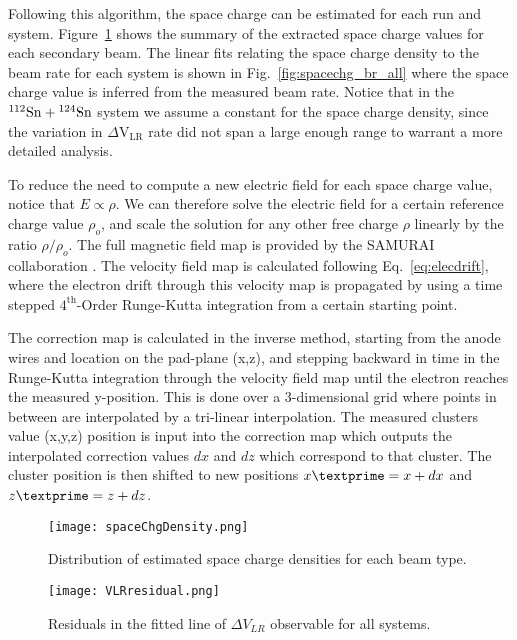 Following this algorithm, the space charge can be estimated for each run and system. Figure~\ref{fig:scDensity} shows the summary of the extracted space charge values for each secondary beam. The linear fits relating the space charge density to the beam rate for each system is shown in Fig.~\ref{fig:spacechg_br_all} where the space charge value is inferred from the measured beam rate. Notice that in the ${}^{112}\mathrm{Sn} + {}^{124}\mathrm{Sn}$ system we assume a constant for the space charge density, since the variation in $\Delta\mathrm{V}_\mathrm{LR}$ rate did not span a large enough range to warrant a more detailed analysis. 

To reduce the need to compute a new electric field for each space charge value, notice that $E \propto \rho$. We can therefore solve the electric field for a certain reference charge value $\rho_o$, and scale the solution for any other free charge $\rho$ linearly by the ratio $\rho/\rho_o$. The full magnetic field map is provided by the SAMURAI collaboration \cite{magnet}. The velocity field map is calculated following Eq.~\ref{eq:elecdrift}, where the electron drift through this velocity map is propagated by using a time stepped $\mathrm{4}^{\mathrm{th}}$-Order Runge-Kutta integration from a certain starting point.
  
 The correction map is calculated in the inverse method, starting from the anode wires and location on the pad-plane (x,z), and stepping backward in time in the Runge-Kutta integration through the velocity field map until the electron reaches the measured y-position. This is done over a 3-dimensional grid where points in between are interpolated by a tri-linear interpolation. The measured clusters value (x,y,z) position is input into the correction map which outputs the interpolated correction values $dx$ and $dz$ which correspond to that cluster. The cluster position is then shifted to new positions $x\textprime = x + dx$ and $z\textprime = z + dz$.
 


\begin{figure}[!htb]
\texttt{[image: spaceChgDensity.png]}
\caption{Distribution of estimated space charge densities for each beam type.}
\label{fig:scDensity}
\end{figure}



\begin{figure}[!htb]
\texttt{[image: VLRresidual.png]}
\caption{Residuals in the fitted line of $\Delta V_{LR}$ observable for all systems.}
\label{fig:vlrResidual}
\end{figure}

